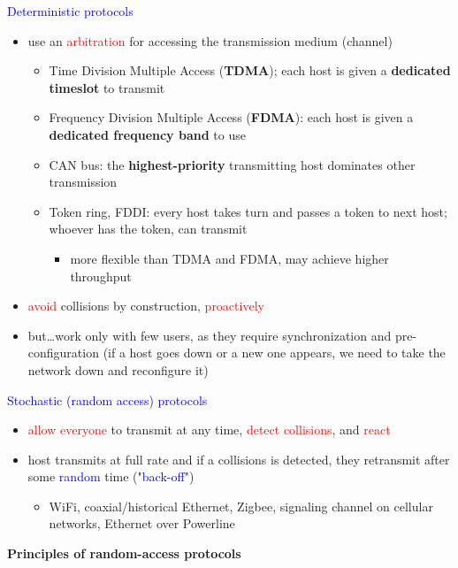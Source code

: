 \documentclass[11pt]{article}
\begin{document}
\textcolor{blue}{Deterministic protocols}
\begin{itemize}
	\item use an \textcolor{red}{arbitration} for accessing the transmission medium (channel)
	\begin{itemize}
		\item Time Division Multiple Access (\textbf{TDMA}); each host is given a \textbf{dedicated timeslot} to transmit
	\item Frequency Division Multiple Access (\textbf{FDMA}): each host is given a \textbf{dedicated frequency band} to use
	\item CAN bus: the \textbf{highest-priority} transmitting host dominates other transmission
	\item Token ring, FDDI: every host takes turn and passes a token to next host; whoever has the token, can transmit
		\begin{itemize}
			\item more flexible than TDMA and FDMA, may achieve higher throughput
		\end{itemize}
 	\end{itemize}
	\item \textcolor{red}{avoid} collisions by construction, \textcolor{red}{proactively}
	\item but…work only with few users, as they require synchronization and pre-configuration (if a host goes down or a new one appears, we need to take the network down and reconfigure it)
\end{itemize}

\textcolor{blue}{Stochastic (random access) protocols}
\begin{itemize}
	\item \textcolor{red}{allow everyone} to transmit at any time, \textcolor{red}{detect collisions}, and \textcolor{red}{react}
	\item host transmits at full rate and if a collisions is detected, they retransmit after some \textcolor{blue}{random} time ("\textcolor{blue}{back-off}") 
		\begin{itemize}
			\item WiFi, coaxial/historical Ethernet, Zigbee, signaling channel on cellular networks, Ethernet over Powerline
		\end{itemize}
\end{itemize}

\newpage

\begin{center}
  {\LARGE \textbf{Principles of random-access protocols}}
\end{center}
\end{document}
